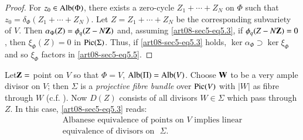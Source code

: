 \begin{proof}
For $z_{0}\in \operatorname{\mathrm{Alb}}(\Phi)$, there exists a zero-cycle $Z_{1}+\cdots+Z_{N}$ on $\Phi$ such that $z_{0}=\delta_{\Phi}(Z_{1}+\cdots+Z_{N})$. Let $Z=Z_{1}+\cdots+Z_{N}$ be the corresponding subvariety of $V$. Then $\alpha_{\Phi}(Z)=\phi_{q}(Z-N\mathbf{Z})$ and, assuming \eqref{art08-sec5-eq5.3}, if $\phi_{q}(Z-N\mathbf{Z})=0$, then $\xi_{\Phi}(Z)=0$ in $\operatorname{\mathrm{Pic}}(\Sigma)$. Thus, if \eqref{art08-sec5-eq5.3} holds, $\ker \alpha_{\Phi}\supset \ker \xi_{\Phi}$ and so $\xi_{\Phi}$ factors in \eqref{art08-sec5-eq5.5}.
\end{proof}

\begin{example}\label{art08-sec5-exam2}
Let\pageoriginale $\mathbf{Z}=$ point on $V$ so that $\Phi=V$, $\operatorname{\mathrm{Alb}}(\Pi)=\operatorname{\mathrm{Alb}}(V)$. Choose $\mathbf{W}$ to be a very ample divisor on $V$; then $\Sigma$ is a {\em projective fibre bundle} over $\operatorname{\mathrm{Pic}}(V)$ with $|W|$ as fibre through $W$ (c.f. \cite{art08-key18}). Now $D(Z)$ consists of all divisors $W\in \Sigma$ which pass through $Z$. In this case, \eqref{art08-sec5-eq5.3} reads:
\begin{equation}
\begin{array}{l}
\text{Albanese equivalence of points on $V$ implies linear}\\[2pt]
\text{equivalence of divisors on~ } \Sigma.
\end{array}\label{art08-sec5-eq5.6}
\end{equation}
\end{example}

